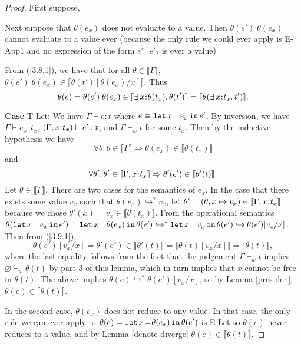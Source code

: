 \documentclass[11pt]{article}
\newcommand{\bind}{\hspace{0.05em}{:}\hspace{0.05em}} %
\newcommand{\lb}{\llbracket}         %
\newcommand{\rb}{\rrbracket}         %
\newcommand{\step}{\hookrightarrow}
\newcommand{\many}{\hookrightarrow^*}
\newcommand{\existype}[3]{\exists\, #1\bind #2.\, #3}
\newcommand{\foralltheta}{\forall\theta.\,\theta\in\lb\Gamma\rb}
\newcommand{\letin}[3]{{\tt let}\,#1\hspace{0.1em}{=}\hspace{0.1em}#2\,{\tt in}\,#3}
\begin{document}
\begin{proof}
First suppose,



Next suppose that $\theta(e_x)$ does not evaluate to a value. Then 
$\theta(e')\;\theta(e_x)$ cannot evaluate to a value ever (because the only rule we could ever apply is {\sc E-App1} and no expression of the form $e'_1\;e'_2$ is ever a value)

From (\ref{3.8.1}), we have that for all $\theta \in \lb\Gamma\rb$, $\theta(e')\; \theta(e_x) \in \lb\theta(t')[\theta(e_x)/x]\rb$. Thus
\begin{equation}
\theta(e) = \theta(e')\; \theta(e_x) \in \lb \existype{x}{\theta(t_x)}{\theta(t')}\rb = \lb\theta(\existype{x}{t_x}{t'})\rb
.\end{equation}

{\bf Case} {\sc T-Let}: We have $\Gamma \vdash e : t$ where
$e \equiv \letin{x}{e_x}{e'}$.
By inversion, we have $\Gamma \vdash e_x : t_x$,\; $(\Gamma,x\bind t_x) \vdash e' : t$, and $\Gamma \vdash_w t$
for some $t_x$. Then by the inductive hypothesis we have
\[
\foralltheta \Rightarrow \theta(e_x) \in \lb\theta(t_x)\rb
\] and 
\begin{equation}\label{3.9.1}
\forall\theta'.\, \theta' \in \lb\Gamma,x\bind t_x\rb \Rightarrow \theta'(e') \in \lb\theta'(t)\rb.\end{equation}
Let $\theta \in \lb\Gamma\rb$. There are two cases for the semantics of $e_x$. In the case that there exists some value $v_x$ such that $\theta(e_x) \many v_x$, let $\theta' = (\theta, x\mapsto v_x)\in \lb\Gamma,x\bind t_x\rb$ because we chose $\theta'(x) = v_x \in \lb\theta(t_x)\rb$. 
From the operational semantics $\theta(\letin{x}{e_x}{e'}) = \letin{x}{\theta(e_x)}{\theta(e')} \many \letin{x}{v_x}{\theta(e')} \step \theta(e')[v_x/x]$. 
Then from (\ref{3.9.1}),
\[
\theta(e')[v_x/x] = \theta'(e') \in \lb\theta'(t)\rb = \lb\theta(t)[v_x/x]\rb = \lb\theta(t)\rb,
\]
where the last equality follows from the fact that the judgement $\Gamma \vdash_w t$ implies $\varnothing \vdash_w \theta(t)$ by part 3 of this lemma, which in turn implies that $x$ cannot be free in $\theta(t)$.
The above implies
$\theta(e) \many \theta(e')[v_x/x]$, so by Lemma \ref{pres-den}, $\theta(e) \in \lb\theta(t)\rb$.

In the second case, $\theta(e_x)$ does not reduce to any value. In that case, the only rule we can ever apply to $\theta(e) = \letin{x}{\theta(e_x)}{\theta(e')}$ is {\sc E-Let} so $\theta(e)$ never reduces to a value, and by Lemma \ref{denote-diverge} $\theta(e) \in \lb\theta(t)\rb$.


\end{proof}
\end{document}
